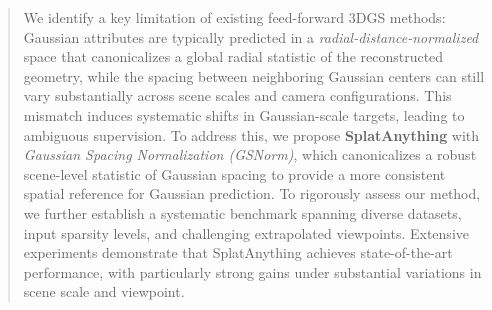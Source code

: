 \begin{abstract}

    We identify a key limitation of existing feed-forward 3DGS methods: Gaussian attributes are typically predicted in a \textit{radial-distance-normalized} space that canonicalizes a global radial statistic of the reconstructed geometry, while the spacing between neighboring Gaussian centers can still vary substantially across scene scales and camera configurations. This mismatch induces systematic shifts in Gaussian-scale targets, leading to ambiguous supervision.
    To address this, we propose \textbf{SplatAnything} with \textit{Gaussian Spacing Normalization (GSNorm)}, which canonicalizes a robust scene-level statistic of Gaussian spacing to provide a more consistent spatial reference for Gaussian prediction. To rigorously assess our method, we further establish a systematic benchmark spanning diverse datasets, input sparsity levels, and challenging extrapolated viewpoints. Extensive experiments demonstrate that SplatAnything achieves state-of-the-art performance, with particularly strong gains under substantial variations in scene scale and viewpoint.


\end{abstract}